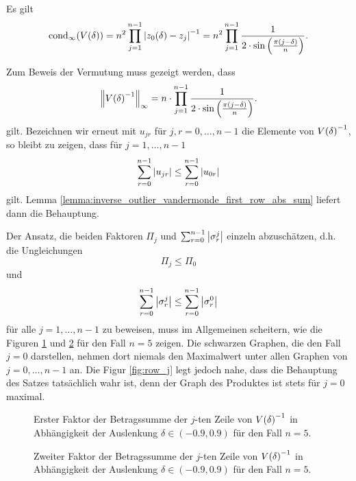 \begin{assumption}
    \label{assumption:infty_outlier_condition}
    Es gilt
    \begin{equation}
        \label{eq:infty_condition_assumption}
        \cond[\infty]{ \Vand{\delta} }
        = n^2 \prod_{j=1}^{n-1} \abs{ z_0(\delta) - z_j }^{-1}
        = n^2 \prod_{j=1}^{n-1} \frac{1}{2 \cdot \sin \left(\frac{\pi (j - \delta)}{n} \right)}.
    \end{equation}
\end{assumption}

\begin{remark}
    Zum Beweis der Vermutung muss gezeigt werden, dass
    \[
        \left\lVert V \! \left( \delta \right)^{-1} \right\rVert_\infty
        = n \cdot \prod_{j=1}^{n-1} \frac{1}{2 \cdot \sin \left(\frac{\pi (j - \delta)}{n} \right)}.
    \]
    gilt.
    Bezeichnen wir erneut mit $u_{jr}$ für $j,r = 0, \dots, n-1$ die Elemente von $V \! \left( \delta \right)^{-1}$,
    so bleibt zu zeigen, dass für $j = 1, \dots, n-1$
    \[
        \sum_{r=0}^{n-1} \left\lvert u_{jr} \right\rvert \leq \sum_{r=0}^{n-1} \left\lvert u_{0r} \right\rvert
    \]
    gilt.
    Lemma \ref{lemma:inverse_outlier_vandermonde_first_row_abs_sum} liefert dann die Behauptung.

    \noindent Der Ansatz, die beiden Faktoren $\Pi_j$ und
    $\sum_{r=0}^{n-1} \left\lvert \sigma_r^j \right\rvert$ einzeln abzuschätzen,
    d.h. die Ungleichungen
    \[
        \Pi_j \leq \Pi_0
    \]
    und
    \[
        \sum_{r=0}^{n-1} \left\lvert \sigma_r^j \right\rvert \leq \sum_{r=0}^{n-1} \left\lvert \sigma_r^0 \right\rvert
    \]
    für alle $ j=1, \dots, n-1$ zu beweisen, muss im Allgemeinen scheitern, wie
    die Figuren \ref{fig:pi_j} und \ref{fig:sigma_row_sum} für den Fall $n=5$ zeigen.
    Die schwarzen Graphen, die den Fall $j=0$ darstellen, nehmen dort niemals
    den Maximalwert unter allen Graphen von $j=0, \dots, n-1$ an.
    Die Figur \ref{fig:row_j} legt jedoch nahe, dass die Behauptung des
    Satzes tatsächlich wahr ist, denn der Graph des Produktes ist stets für
    $j=0$ maximal.

    \begin{figure}[H]
        \centering
        
        \caption{Erster Faktor der Betragssumme der $j$-ten Zeile
                 von $V \! \left( \delta \right)^{-1}$ in Abhängigkeit der Auslenkung
                 $\delta \in (-0.9, 0.9)$
                für den Fall $n=5$.}
        \label{fig:pi_j}
    \end{figure}

    \begin{figure}[H]
        \centering
        
        \caption{Zweiter Faktor
                der Betragssumme der $j$-ten Zeile
                von $V \! \left( \delta \right)^{-1}$ in
                Abhängigkeit der Auslenkung $\delta \in (-0.9, 0.9)$
                für den Fall $n=5$.}
        \label{fig:sigma_row_sum}
    \end{figure}


\end{remark}
